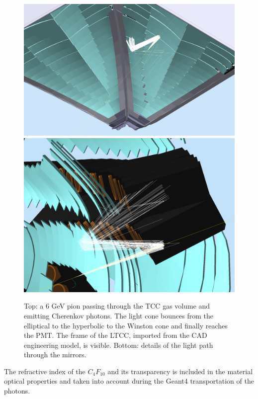 \begin{figure}
	\centering
	\includegraphics[width=0.99\columnwidth,keepaspectratio]{img/ltccGeometry.png}
	\includegraphics[width=0.99\columnwidth,keepaspectratio]{img/ltccDetail.png}
	\caption{Top: a 6 GeV pion passing through the TCC gas volume and emitting Cherenkov photons. The light cone
            bounces from the elliptical to the hyperbolic to the Winston cone and finally reaches the PMT. The
            frame of the LTCC, imported from the CAD engineering model, is visible.
            Bottom: details of the light path through the mirrors. }
	\label{fig:ltccGeometry}
\end{figure}

The refractive index of the $C_4F_10$ and its transparency is included in the material optical properties and taken
into account during the Geant4 transportation of the photons.

